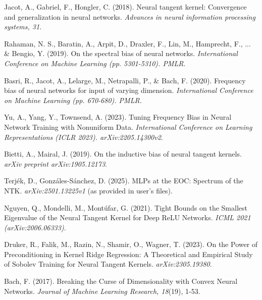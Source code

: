 \documentclass{article}
\begin{document}
\begin{thebibliography}{99} %

Jacot, A., Gabriel, F., Hongler, C. (2018).
Neural tangent kernel: Convergence and generalization in neural networks.
\textit{Advances in neural information processing systems, 31}.

Rahaman, N. S., Baratin, A., Arpit, D., Draxler, F., Lin, M., Hamprecht, F., ... & Bengio, Y. (2019).
On the spectral bias of neural networks.
\textit{International Conference on Machine Learning (pp. 5301-5310). PMLR}.

Basri, R., Jacot, A., Lelarge, M., Netrapalli, P., & Bach, F. (2020).
Frequency bias of neural networks for input of varying dimension.
\textit{International Conference on Machine Learning (pp. 670-680). PMLR}.

Yu, A., Yang, Y., Townsend, A. (2023).
Tuning Frequency Bias in Neural Network Training with Nonuniform Data.
\textit{International Conference on Learning Representations (ICLR 2023). arXiv:2205.14300v2}.

Bietti, A., Mairal, J. (2019).
On the inductive bias of neural tangent kernels.
\textit{arXiv preprint arXiv:1905.12173}.

Terjék, D., Gonzáles-Sánchez, D. (2025). MLPs at the EOC: Spectrum of the NTK. \textit{arXiv:2501.13225v1} (as provided in user's files).

Nguyen, Q., Mondelli, M., Montúfar, G. (2021). Tight Bounds on the Smallest Eigenvalue of the Neural Tangent Kernel for Deep ReLU Networks. \textit{ICML 2021 (arXiv:2006.06333)}.

Druker, R., Falik, M., Razin, N., Shamir, O., Wagner, T. (2023). On the Power of Preconditioning in Kernel Ridge Regression: A Theoretical and Empirical Study of Sobolev Training for Neural Tangent Kernels. \textit{arXiv:2305.19380}.

Bach, F. (2017). Breaking the Curse of Dimensionality with Convex Neural Networks. \textit{Journal of Machine Learning Research, 18}(19), 1-53.

\end{thebibliography}

\end{document}
